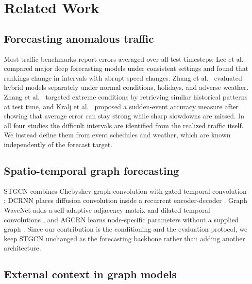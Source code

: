 \documentclass[letterpaper]{article}
\begin{document}
\section{Related Work}

\subsection{Forecasting anomalous traffic}

Most traffic benchmarks report errors averaged over all test timesteps. Lee et al.~ compared major deep forecasting models under consistent settings and found that rankings change in intervals with abrupt speed changes. Zhang et al.~ evaluated hybrid models separately under normal conditions, holidays, and adverse weather. Zhang et al.~ targeted extreme conditions by retrieving similar historical patterns at test time, and Kralj et al.~ proposed a sudden-event accuracy measure after showing that average error can stay strong while sharp slowdowns are missed. In all four studies the difficult intervals are identified from the realized traffic itself. We instead define them from event schedules and weather, which are known independently of the forecast target.

\subsection{Spatio-temporal graph forecasting}

STGCN combines Chebyshev graph convolution with gated temporal convolution \cite{yu2018stgcn}; DCRNN places diffusion convolution inside a recurrent encoder-decoder \cite{li2018dcrnn}. Graph WaveNet adds a self-adaptive adjacency matrix and dilated temporal convolutions \cite{wu2019graphwavenet}, and AGCRN learns node-specific parameters without a supplied graph \cite{bai2020agcrn}. Since our contribution is the conditioning and the evaluation protocol, we keep STGCN unchanged as the forecasting backbone rather than adding another architecture.

\subsection{External context in graph models}
\end{document}
